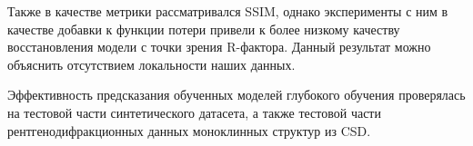 Также в качестве метрики рассматривался SSIM, однако эксперименты с ним в качестве добавки к функции потери привели к более низкому качеству восстановления модели с точки зрения R-фактора. Данный результат можно объяснить отсутствием локальности наших данных.

Эффективность предсказания обученных моделей глубокого обучения проверялась на тестовой части синтетического датасета, а также тестовой части рентгенодифракционных данных моноклинных структур из CSD.
